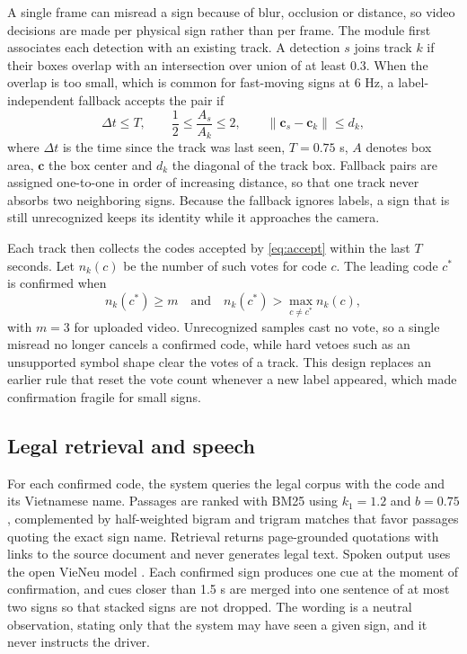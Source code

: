 \documentclass[conference,a4paper]{IEEEtran}
\begin{document}
A single frame can misread a sign because of blur, occlusion or distance, so video decisions are made per physical sign rather than per frame. The module first associates each detection with an existing track. A detection $s$ joins track $k$ if their boxes overlap with an intersection over union of at least 0.3. When the overlap is too small, which is common for fast-moving signs at 6 Hz, a label-independent fallback accepts the pair if
\begin{equation}
\Delta t \leq T, \qquad \frac{1}{2} \leq \frac{A_s}{A_k} \leq 2, \qquad \lVert \mathbf{c}_s - \mathbf{c}_k \rVert \leq d_k ,
\label{eq:assoc}
\end{equation}
where $\Delta t$ is the time since the track was last seen, $T = 0.75$ s, $A$ denotes box area, $\mathbf{c}$ the box center and $d_k$ the diagonal of the track box. Fallback pairs are assigned one-to-one in order of increasing distance, so that one track never absorbs two neighboring signs. Because the fallback ignores labels, a sign that is still unrecognized keeps its identity while it approaches the camera.

Each track then collects the codes accepted by \eqref{eq:accept} within the last $T$ seconds. Let $n_k(c)$ be the number of such votes for code $c$. The leading code $c^{*}$ is confirmed when
\begin{equation}
n_k(c^{*}) \geq m \quad \text{and} \quad n_k(c^{*}) > \max_{c \neq c^{*}} n_k(c),
\label{eq:vote}
\end{equation}
with $m = 3$ for uploaded video. Unrecognized samples cast no vote, so a single misread no longer cancels a confirmed code, while hard vetoes such as an unsupported symbol shape clear the votes of a track. This design replaces an earlier rule that reset the vote count whenever a new label appeared, which made confirmation fragile for small signs.

\subsection{Legal retrieval and speech}

For each confirmed code, the system queries the legal corpus with the code and its Vietnamese name. Passages are ranked with BM25 \cite{robertson2009} using $k_1 = 1.2$ and $b = 0.75$, complemented by half-weighted bigram and trigram matches that favor passages quoting the exact sign name. Retrieval returns page-grounded quotations with links to the source document and never generates legal text. Spoken output uses the open VieNeu model \cite{vieneu}. Each confirmed sign produces one cue at the moment of confirmation, and cues closer than 1.5 s are merged into one sentence of at most two signs so that stacked signs are not dropped. The wording is a neutral observation, stating only that the system may have seen a given sign, and it never instructs the driver.
\end{document}
